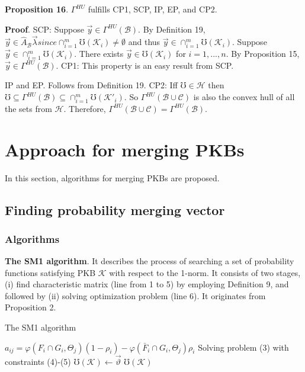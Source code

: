 \documentclass[]{iosart2c}
\begin{document}
\textbf{Proposition 16}. $\Gamma^{HU}$ fulfills CP1, SCP, IP, EP, and CP2.
 
\textbf{Proof}. SCP: Suppose $\vec{y}  \in \Gamma^{HU}(\mathcal{B})$. By Definition
19, $\vec{y} \in \widehat{A}_\mathcal{B}\vec{\lambda} since \cap^m_{i=1}\mho(\mathcal{K}_i) \neq \emptyset$ and thus $\vec{y} \in 
\cap^m_{i=1}\mho(\mathcal{K}_i)$. Suppose $\vec{y} \in \cap^m_{i=1}\mho(\mathcal{K}_i)$. There exists
$\vec{y} \in \mho(\mathcal{K}_i)$ for $i = 1, ... , n$. By Proposition 15, $\vec{y} \in 
\Gamma^{HU}(\mathcal{B})$. CP1: This property is an easy result from
 SCP. 
 
IP and EP. Follows from Definition 19. CP2: Iff $\mho \in 
\mathcal{H}$ then $\mho \subseteq \Gamma^{HU}(\mathcal{B}) \subseteq \cap^m_{i=1}\mho(\mathcal{K}'_i)$. So $\Gamma^{HU}(\mathcal{B} \cup \mathcal{C})$
is also the convex hull of all the sets from $\mathcal{H}$. Therefore, 
$\Gamma^{HU}(\mathcal{B} \cup \mathcal{C}) = \Gamma^{HU}(\mathcal{B})$.

\section{Approach for merging PKBs}

In this section, algorithms for merging PKBs are proposed.

\subsection{Finding probability merging vector}

\subsubsection{Algorithms}

\textbf{The SM1 algorithm}. It describes the process of
searching a set of probability functions satisfying
PKB $\mathcal{K}$ with respect to the 1-norm. It consists of two
stages, (i) find characteristic matrix (line from 1 to 5)
by employing Definition 9, and followed by (ii) solving
optimization problem (line 6). It originates from
Proposition 2.

\begin{algorithm}
\caption{The SM1 algorithm}
\begin{algorithmic}[1]
      \State $a_{ij} = \varphi(F_i \cap G_i,\Theta_j)(1 - \rho_i) - \varphi(\bar{F}_i \cap G_i,\Theta_j )\rho_i$
  \EndFor
\EndFor
\State Solving problem (3) with constraints (4)-(5)
\State $\mho(\mathcal{K}) \gets \vec{\vartheta}$
\State \Return $\mho(\mathcal{K})$
\end{algorithmic}
\end{algorithm}
\end{document}
